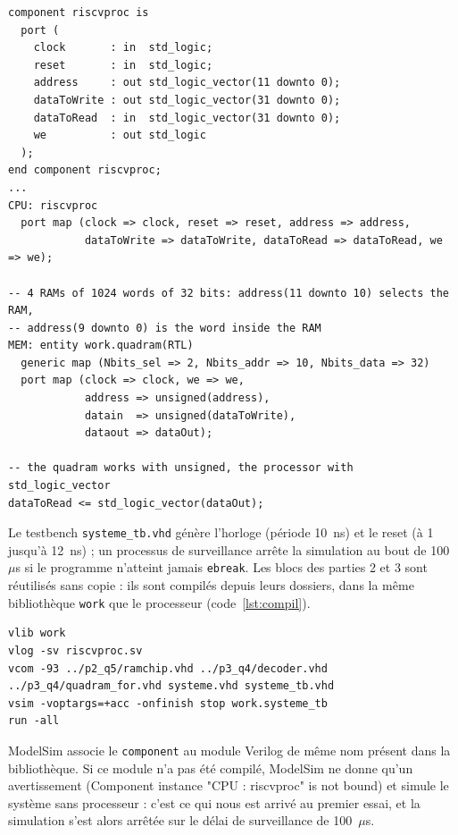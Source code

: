 \noindent\begin{minipage}{\linewidth}
\begin{lstlisting}[style=vhdl, caption={Extrait de \texttt{systeme.vhd}}, label={lst:systeme}]
component riscvproc is
  port (
    clock       : in  std_logic;
    reset       : in  std_logic;
    address     : out std_logic_vector(11 downto 0);
    dataToWrite : out std_logic_vector(31 downto 0);
    dataToRead  : in  std_logic_vector(31 downto 0);
    we          : out std_logic
  );
end component riscvproc;
...
CPU: riscvproc
  port map (clock => clock, reset => reset, address => address,
            dataToWrite => dataToWrite, dataToRead => dataToRead, we => we);

-- 4 RAMs of 1024 words of 32 bits: address(11 downto 10) selects the RAM,
-- address(9 downto 0) is the word inside the RAM
MEM: entity work.quadram(RTL)
  generic map (Nbits_sel => 2, Nbits_addr => 10, Nbits_data => 32)
  port map (clock => clock, we => we,
            address => unsigned(address),
            datain  => unsigned(dataToWrite),
            dataout => dataOut);

-- the quadram works with unsigned, the processor with std_logic_vector
dataToRead <= std_logic_vector(dataOut);
\end{lstlisting}
\end{minipage}\par

Le testbench \texttt{systeme\_tb.vhd} génère l'horloge (période 10~ns) et le reset (à 1 jusqu'à
12~ns) ; un processus de surveillance arrête la simulation au bout de 100~$\mu$s si le programme
n'atteint jamais \texttt{ebreak}. Les blocs des parties 2 et 3 sont réutilisés sans copie : ils
sont compilés depuis leurs dossiers, dans la même bibliothèque \texttt{work} que le processeur
(code~\ref{lst:compil}).

\noindent\begin{minipage}{\linewidth}
\begin{lstlisting}[style=code, caption={Compilation et simulation du système dans ModelSim}, label={lst:compil}]
vlib work
vlog -sv riscvproc.sv
vcom -93 ../p2_q5/ramchip.vhd ../p3_q4/decoder.vhd ../p3_q4/quadram_for.vhd systeme.vhd systeme_tb.vhd
vsim -voptargs=+acc -onfinish stop work.systeme_tb
run -all
\end{lstlisting}
\end{minipage}\par

ModelSim associe le \texttt{component} au module Verilog de même nom présent dans la
bibliothèque. Si ce module n'a pas été compilé, ModelSim ne donne qu'un avertissement
(\og Component instance "CPU : riscvproc" is not bound\fg{}) et simule le système sans
processeur : c'est ce qui nous est arrivé au premier essai, et la simulation s'est alors arrêtée
sur le délai de surveillance de 100~$\mu$s.


